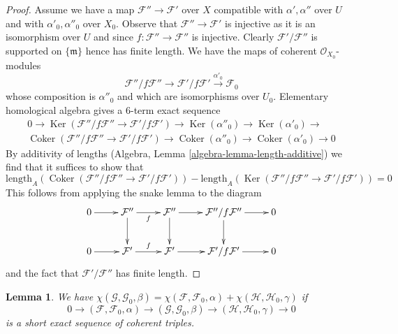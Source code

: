 \documentclass{stacks-project}
\theoremstyle{plain}
\newtheorem{lemma}[subsection]{Lemma}
\theoremstyle{definition}
\theoremstyle{remark}
\numberwithin{equation}{subsection}
\def\Ker{\mathop{\mathrm{Ker}}}
\def\Coker{\mathop{\mathrm{Coker}}}
\begin{document}
\begin{proof}
\medskip\noindent
Assume we have a map $\mathcal{F}'' \to \mathcal{F}'$ over $X$ compatible with
$\alpha', \alpha''$ over $U$ and with $\alpha'_0, \alpha''_0$ over $X_0$.
Observe that $\mathcal{F}'' \to \mathcal{F}'$ is injective as it is an
isomorphism over $U$ and since $f : \mathcal{F}'' \to \mathcal{F}''$
is injective. Clearly $\mathcal{F}'/\mathcal{F}''$ is supported on
$\{\mathfrak m\}$ hence has finite length. We have the maps
of coherent $\mathcal{O}_{X_0}$-modules
$$
\mathcal{F}''/f\mathcal{F}'' \to
\mathcal{F}'/f\mathcal{F}' \xrightarrow{\alpha'_0}
\mathcal{F}_0
$$
whose composition is $\alpha''_0$ and which are isomorphisms over $U_0$.
Elementary homological algebra gives a $6$-term exact sequence
$$
\begin{matrix}
0 \to
\Ker(\mathcal{F}''/f\mathcal{F}'' \to \mathcal{F}'/f\mathcal{F}') \to
\Ker(\alpha''_0) \to
\Ker(\alpha'_0) \to \\
\Coker(\mathcal{F}''/f\mathcal{F}'' \to \mathcal{F}'/f\mathcal{F}') \to
\Coker(\alpha''_0) \to
\Coker(\alpha'_0) \to 0
\end{matrix}
$$
By additivity of lengths (Algebra, Lemma \ref{algebra-lemma-length-additive})
we find that it suffices to show that
$$
\text{length}_A(
\Coker(\mathcal{F}''/f\mathcal{F}'' \to \mathcal{F}'/f\mathcal{F}')) -
\text{length}_A(
\Ker(\mathcal{F}''/f\mathcal{F}'' \to \mathcal{F}'/f\mathcal{F}')) = 0
$$
This follows from applying the snake lemma to
the diagram
$$
\xymatrix{
0 \ar[r] &
\mathcal{F}'' \ar[r]_f \ar[d] &
\mathcal{F}'' \ar[r] \ar[d] &
\mathcal{F}''/f\mathcal{F}'' \ar[r] \ar[d] &
0 \\
0 \ar[r] &
\mathcal{F}' \ar[r]^f &
\mathcal{F}' \ar[r] &
\mathcal{F}'/f\mathcal{F}' \ar[r] &
0
}
$$
and the fact that $\mathcal{F}'/\mathcal{F}''$ has finite length.
\end{proof}

\begin{lemma}
\label{lemma-ses-chi-triple}
We have
$\chi(\mathcal{G}, \mathcal{G}_0, \beta) =
\chi(\mathcal{F}, \mathcal{F}_0, \alpha) +
\chi(\mathcal{H}, \mathcal{H}_0, \gamma)$ if
$$
0 \to
(\mathcal{F}, \mathcal{F}_0, \alpha) \to
(\mathcal{G}, \mathcal{G}_0, \beta) \to
(\mathcal{H}, \mathcal{H}_0, \gamma)
\to 0
$$
is a short exact sequence of coherent triples.
\end{lemma}
\end{document}
